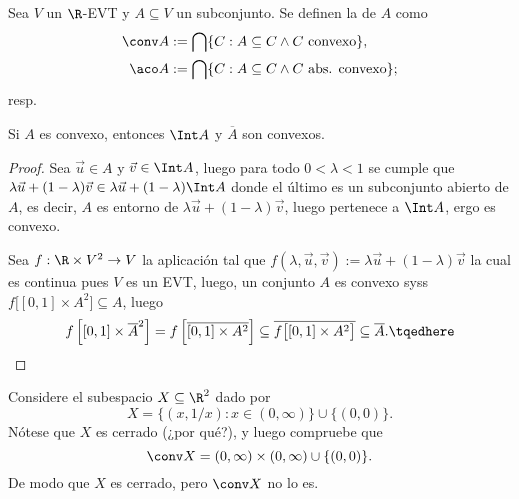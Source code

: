 \documentclass[topologia-analisis.tex]{subfiles}
\begin{document}
\begin{mydef}
	Sea $V$ un $\R$-EVT y $A \subseteq V$ un subconjunto.
	Se definen la  de $A$ como
	\begin{align*}
		\conv A &:= \bigcap\{C : A\subseteq C\wedge C\text{ convexo}\},\\
		\aco A  &:= \bigcap\{C : A\subseteq C\wedge C\text{ abs. convexo}\};
	\end{align*}
	resp.
\end{mydef}

\begin{prop}
	Si $A$ es convexo, entonces $\Int A$ y $\overline A$ son convexos.
\end{prop}
\begin{proof}
	Sea $\vec u\in A$ y $\vec v\in\Int A$, luego para todo $0<\lambda<1$ se cumple que $\lambda\vec u + (1-\lambda)\vec v \in \lambda\vec u + (1-\lambda)\Int A$ donde el último es un subconjunto abierto de $A$, es decir, $A$ es entorno de $\lambda\vec u + (1-\lambda)\vec v$, luego pertenece a $\Int A$, ergo es convexo.
	\par
	Sea $f:\R\times V^2 \to V$ la aplicación tal que $f(\lambda,\vec u,\vec v) := \lambda\vec u + (1-\lambda)\vec v$ la cual es continua pues $V$ es un EVT, luego, un conjunto $A$ es convexo syss $f\big[ [0,1]\times A^2 \big] \subseteq A$, luego
	\begin{equation}
		f\left[ [0,1]\times\overline{A}^2 \right] = f\left[ \overline{ [0,1]\times A^2 } \right]
		\subseteq \overline{ f\big[ [0,1]\times A^2 \big] } \subseteq \overline A. \tqedhere
	\end{equation}
\end{proof}

\begin{ex}
	Considere el subespacio $X \subseteq \R^2$ dado por
	$$ X = \{ (x, 1/x) : x \in (0, \infty) \} \cup \{ (0, 0) \}. $$
	Nótese que $X$ es cerrado (¿por qué?), y luego compruebe que
	$$ \conv X = (0, \infty) \times (0, \infty) \cup \{ (0, 0) \}. $$
	De modo que $X$ es cerrado, pero $\conv X$ no lo es.
\end{ex}
\end{document}

